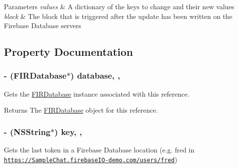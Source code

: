 \begin{DoxyParams}{Parameters}
{\em values} & A dictionary of the keys to change and their new values \\
\hline
{\em block} & The block that is triggered after the update has been written on the Firebase Database servers \\
\hline
\end{DoxyParams}


\subsection{Property Documentation}
\hypertarget{interface_f_i_r_database_reference_a36e08d9e256dd458c129d50c09ddebfc}{}
\subsubsection[{database}]{\setlength{\rightskip}{0pt plus 5cm}-\/ ({\bf F\+I\+R\+Database}$\ast$) database\hspace{0.3cm}{\ttfamily [read]}, {\ttfamily [nonatomic]}, {\ttfamily [strong]}}\label{interface_f_i_r_database_reference_a36e08d9e256dd458c129d50c09ddebfc}
Gets the \hyperlink{interface_f_i_r_database}{F\+I\+R\+Database} instance associated with this reference.

\begin{DoxyReturn}{Returns}
The \hyperlink{interface_f_i_r_database}{F\+I\+R\+Database} object for this reference. 
\end{DoxyReturn}
\hypertarget{interface_f_i_r_database_reference_a47283623fe88656fa9c12d0296f002eb}{}
\subsubsection[{key}]{\setlength{\rightskip}{0pt plus 5cm}-\/ (N\+S\+String$\ast$) key\hspace{0.3cm}{\ttfamily [read]}, {\ttfamily [nonatomic]}, {\ttfamily [strong]}}\label{interface_f_i_r_database_reference_a47283623fe88656fa9c12d0296f002eb}
Gets the last token in a Firebase Database location (e.\+g. \textquotesingle{}fred\textquotesingle{} in \href{https://SampleChat.firebaseIO-demo.com/users/fred}{\tt https\+://\+Sample\+Chat.\+firebase\+I\+O-\/demo.\+com/users/fred})

